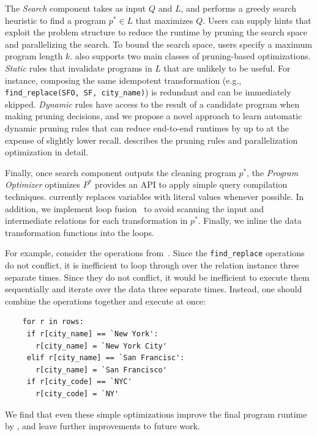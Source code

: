 The {\it Search} component takes as input $Q$ and $L$, and performs a greedy search heuristic to find a program $p^* \in L$ that maximizes $Q$.  Users can supply hints that exploit the problem structure to reduce the runtime by pruning the search space and parallelizing the search.  To bound the search space, users specify a maximum program length $k$.    \sys also supports two main classes of pruning-based optimizations. {\it Static} rules that invalidate programs in $L$ that are unlikely to be useful.  For instance, composing the same idempotent transformation (e.g., \texttt{find\_replace(SFO, SF, city\_name)}) is redundant and can be immediately skipped.  {\it Dynamic} rules have access to the result of a candidate program when making pruning decisions, and we propose a novel approach to learn automatic dynamic pruning rules that can reduce end-to-end runtimes by up to  at the expense of slightly lower recall.   describes the pruning rules and parallelization optimization in detail.


Finally, once search component outputs the cleaning program $p^*$, the {\it Program Optimizer} optimizes $P^*$ provides an API to apply simple query compilation techniques.  \sys currently replaces variables with literal values whenever possible.  In addition, we implement loop fusion~\cite{} to avoid scanning the input and intermediate relations for each transformation in $p^*$. Finally, we inline the data transformation functions into the loops.    

For example, consider the operations from~.  Since the \texttt{find\_replace} operations do not conflict, it is inefficient to loop through over the relation instance three separate times.  
Since they do not conflict, it would be inefficient to execute them sequentially and iterate over the data three separate times.
Instead, one should combine the operations together and execute at once:
\begin{lstlisting}
    for r in rows:
     if r[city_name] == `New York':
       r[city_name] = `New York City'
     elif r[city_name] == `San Francisc':
       r[city_name] = `San Francisco'
     if r[city_code] == `NYC'
       r[city_code] = `NY'
\end{lstlisting}
We find that even these simple optimizations improve the final program runtime by , and leave further improvements to future work.




